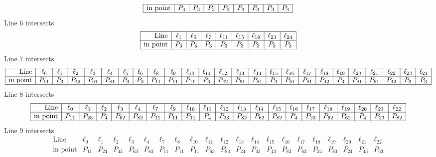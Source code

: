 \documentclass{article}
\begin{document}
{$$\begin{array}{|r*{8}{|c}|}
\hline
\mbox{in point}  & P_{3} & P_{3} & P_{3} & P_{3} & P_{3} & P_{3} & P_{3} & P_{3}\\
\hline
\end{array}
$$
Line 6 intersects 
$$
\begin{array}{|r*{8}{|c}|}
\hline
\mbox{Line}  & \ell_{1} & \ell_{5} & \ell_{7} & \ell_{11} & \ell_{15} & \ell_{19} & \ell_{23} & \ell_{24}\\
\hline
\mbox{in point}  & P_{3} & P_{3} & P_{3} & P_{3} & P_{3} & P_{3} & P_{3} & P_{3}\\
\hline
\end{array}
$$
Line 7 intersects 
$$
\begin{array}{|r*{24}{|c}|}
\hline
\mbox{Line}  & \ell_{0} & \ell_{1} & \ell_{2} & \ell_{3} & \ell_{4} & \ell_{5} & \ell_{6} & \ell_{8} & \ell_{9} & \ell_{10} & \ell_{11} & \ell_{12} & \ell_{13} & \ell_{14} & \ell_{15} & \ell_{16} & \ell_{17} & \ell_{18} & \ell_{19} & \ell_{20} & \ell_{21} & \ell_{22} & \ell_{23} & \ell_{24}\\
\hline
\mbox{in point}  & P_{11} & P_{3} & P_{42} & P_{61} & P_{81} & P_{3} & P_{3} & P_{11} & P_{11} & P_{11} & P_{3} & P_{42} & P_{61} & P_{81} & P_{3} & P_{61} & P_{81} & P_{42} & P_{3} & P_{81} & P_{61} & P_{42} & P_{3} & P_{3}\\
\hline
\end{array}
$$
Line 8 intersects 
$$
\begin{array}{|r*{20}{|c}|}
\hline
\mbox{Line}  & \ell_{0} & \ell_{1} & \ell_{2} & \ell_{3} & \ell_{4} & \ell_{7} & \ell_{9} & \ell_{10} & \ell_{11} & \ell_{12} & \ell_{13} & \ell_{14} & \ell_{15} & \ell_{16} & \ell_{17} & \ell_{18} & \ell_{19} & \ell_{20} & \ell_{21} & \ell_{22}\\
\hline
\mbox{in point}  & P_{11} & P_{23} & P_{4} & P_{62} & P_{82} & P_{11} & P_{11} & P_{11} & P_{4} & P_{23} & P_{82} & P_{62} & P_{82} & P_{4} & P_{23} & P_{62} & P_{62} & P_{4} & P_{23} & P_{82}\\
\hline
\end{array}
$$
Line 9 intersects 
$$
\begin{array}{|r*{20}{|c}|}
\hline
\mbox{Line}  & \ell_{0} & \ell_{1} & \ell_{2} & \ell_{3} & \ell_{4} & \ell_{7} & \ell_{8} & \ell_{10} & \ell_{11} & \ell_{12} & \ell_{13} & \ell_{14} & \ell_{15} & \ell_{16} & \ell_{17} & \ell_{18} & \ell_{19} & \ell_{20} & \ell_{21} & \ell_{22}\\
\hline
\mbox{in point}  & P_{11} & P_{24} & P_{43} & P_{63} & P_{83} & P_{11} & P_{11} & P_{11} & P_{63} & P_{83} & P_{24} & P_{43} & P_{43} & P_{83} & P_{63} & P_{24} & P_{83} & P_{24} & P_{43} & P_{63}\\

\end{array}$$}
\end{document}
